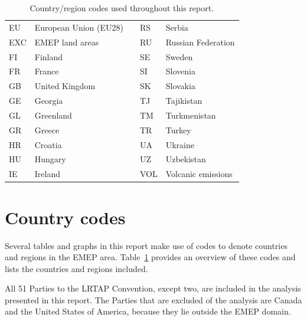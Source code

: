 \begin{table}[!ht]
\begin{center}
\begin{small}
\begin{tabular}{|l|l|c|l|l|}
EU & European Union (EU28) & & RS & Serbia \\  \cline{1-2} \cline{4-5}
EXC & EMEP land areas & & RU & Russian Federation  \\  \cline{1-2} \cline{4-5}
FI & Finland & & SE & Sweden \\  \cline{1-2} \cline{4-5}
FR & France & &  SI & Slovenia\\  \cline{1-2} \cline{4-5}
GB & United Kingdom & & SK & Slovakia\\  \cline{1-2} \cline{4-5}
GE & Georgia & & TJ & Tajikistan\\  \cline{1-2} \cline{4-5}
GL & Greenland & & TM & Turkmenistan \\  \cline{1-2} \cline{4-5}
GR & Greece & & TR & Turkey \\  \cline{1-2} \cline{4-5}
HR & Croatia & & UA & Ukraine \\  \cline{1-2} \cline{4-5}
HU & Hungary & & UZ & Uzbekistan \\  \cline{1-2} \cline{4-5}
IE & Ireland & & VOL & Volcanic emissions \\  \cline{1-2} \cline{4-5}
\end{tabular}
\end{small}
\caption{Country/region codes used throughout this report.}
\label{tab:countries}
\vspace{0.05in}
\end{center}


\end{table}

\section{Country codes}

Several tables and graphs in this report make use of codes to denote
countries and regions in the EMEP area. Table~\ref{tab:countries}
provides an overview of these codes and lists the countries and
regions included.

All 51 Parties to the LRTAP Convention, except two, are included in the
analysis presented in this report. The Parties that are excluded of the
analysis are Canada and the United States of America, because
they lie outside the EMEP domain.






